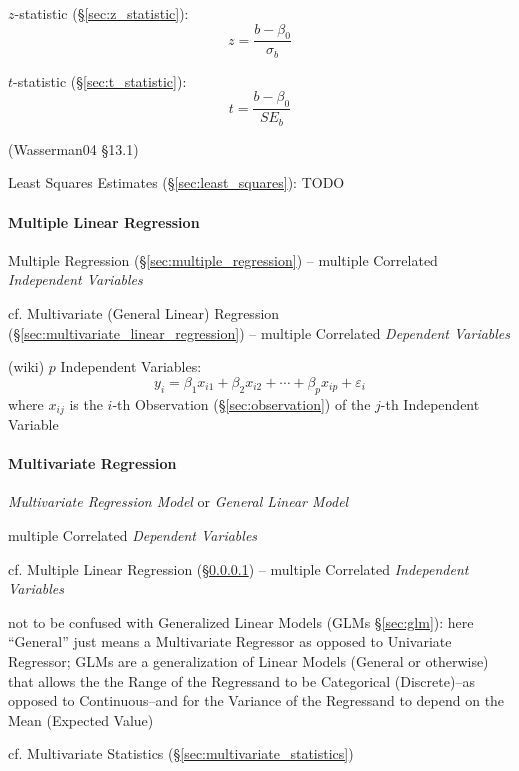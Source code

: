 $z$-statistic (\S\ref{sec:z_statistic}):
\[
  z = \frac{b - \beta_0}{\sigma_b}
\]

$t$-statistic (\S\ref{sec:t_statistic}):
\[
  t = \frac{b - \beta_0}{SE_b}
\]

\asterism

(Wasserman04 \S13.1)

Least Squares Estimates (\S\ref{sec:least_squares}): TODO



\paragraph{Multiple Linear Regression}
\label{sec:multiple_linear_regression}\hfill

Multiple Regression (\S\ref{sec:multiple_regression}) --
multiple Correlated \emph{Independent Variables}

cf. Multivariate (General Linear) Regression
(\S\ref{sec:multivariate_linear_regression}) -- multiple Correlated
\emph{Dependent Variables}

(wiki) $p$ Independent Variables:
\[
  y_i = \beta_1 x_{i1} + \beta_2 x_{i2} + \cdots + \beta_p x_{ip} +
    \varepsilon_i
\]
where $x_{ij}$ is the $i$-th Observation (\S\ref{sec:observation}) of the $j$-th
Independent Variable



\paragraph{Multivariate Regression}
\label{sec:multivariate_regression}\hfill

\emph{Multivariate Regression Model} or \emph{General Linear Model}

multiple Correlated \emph{Dependent Variables}

cf. Multiple Linear Regression (\S\ref{sec:multiple_linear_regression})
-- multiple Correlated \emph{Independent Variables}

\fist not to be confused with Generalized Linear Models (GLMs \S\ref{sec:glm}):
here ``General'' just means a Multivariate Regressor as opposed to Univariate
Regressor; GLMs are a generalization of Linear Models (General or otherwise)
that allows the the Range of the Regressand to be Categorical (Discrete)--as
opposed to Continuous--and for the Variance of the Regressand to depend on the
Mean (Expected Value)

cf. Multivariate Statistics (\S\ref{sec:multivariate_statistics})

